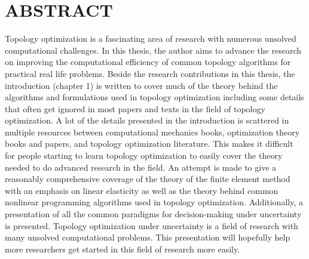 % 
% 
%


\chapter*{ABSTRACT}
\normalsize
{}

Topology optimization is a fascinating area of research with numerous unsolved computational challenges. In this thesis, the author aims to advance the research on improving the computational efficiency of common topology algorithms for practical real life problems. Beside the research contributions in this thesis, the introduction (chapter 1) is written to cover much of the theory behind the algorithms and formulations used in topology optimization including some details that often get ignored in most papers and texts in the field of topology optimization. A lot of the details presented in the introduction is scattered in multiple resources between computational mechanics books, optimization theory books and papers, and topology optimization literature. This makes it difficult for people starting to learn topology optimization to easily cover the theory needed to do advanced research in the field. An attempt is made to give a reasonably comprehensive coverage of the theory of the finite element method with an emphasis on linear elasticity as well as the theory behind common nonlinear programming algorithms used in topology optimization. Additionally, a presentation of all the common paradigms for decision-making under uncertainty is presented. Topology optimization under uncertainty is a field of research with many unsolved computational problems. This presentation will hopefully help more researchers get started in this field of research more easily.

